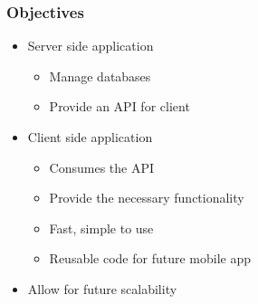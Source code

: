 \documentclass{beamer}
\begin{document}
\begin{frame}
    \frametitle{Objectives}
    \begin{itemize}
        \pause
        \item Server side application 
        \begin{itemize}
            \item Manage databases
            \item Provide an API for client
        \end{itemize}

        \pause
        \vspace{.2cm}
        \item Client side application 
        \begin{itemize}
            \item Consumes the API
            \item Provide the necessary functionality
            \item Fast, simple to use
            \item Reusable code for future mobile app
        \end{itemize}

        \pause
        \vspace{.2cm}
        \item Allow for future scalability
    \end{itemize}    

\end{frame}
\end{document}
